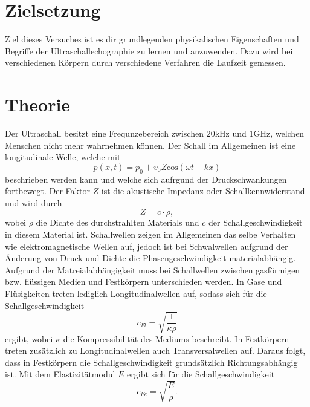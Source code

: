 \section{Zielsetzung}
\label{sec:Zielsetzung}
Ziel dieses Versuches ist es dir grundlegenden physikalischen Eigenschaften und Begriffe der Ultraschallechographie zu lernen und anzuwenden. 
Dazu wird bei verschiedenen Körpern durch verschiedene Verfahren die Laufzeit gemessen.

\section{Theorie}
\label{sec:Theorie}
Der Ultraschall besitzt eine Frequnzebereich zwischen $20 \si{\kilo\Hz}$ und $1 \si{\giga\Hz}$, welchen Menschen nicht mehr wahrnehmen können.
Der Schall im Allgemeinen ist eine longitudinale Welle, welche mit 
\begin{equation*}
    p(x,t) = p_0 + v_0 Z \text{cos}(\omega t - k x)
\end{equation*}
beschrieben werden kann und welche sich aufrgund der Druckschwankungen fortbewegt.
Der Faktor $Z$ ist die akustische Impedanz oder Schallkennwiderstand und wird durch
\begin{equation}
    Z = c \cdot \rho ,
    \label{eqn:Impedanz}
\end{equation}
wobei $\rho$ die Dichte des durchstrahlten Materials und $c$ der Schallgeschwindigkeit in diesem Material ist.
Schallwellen zeigen im Allgemeinen das selbe Verhalten wie elektromagnetische Wellen
auf, jedoch ist bei Schwalwellen aufgrund der Änderung von Druck und Dichte die
Phasengeschwindigkeit materialabhängig.\\
Aufgrund der Matreialabhängigkeit muss bei Schallwellen zwischen gasförmigen bzw. flüssigen Medien und Festkörpern unterschieden werden.
In Gase und Flüsigkeiten treten lediglich Longitudinalwellen auf, sodass sich für die Schallgeschwindigkeit
\begin{equation}
    c_{Fl} = \sqrt{\frac{1}{\kappa \rho}}
    \label{eqn:cFlüssig}
\end{equation}
ergibt, wobei $\kappa$ die Kompressibilität des Mediums beschreibt.
In Festkörpern treten zusätzlich zu Longitudinalwellen auch Transversalwellen auf. Daraus folgt, dass in Festkörpern die Schallgeschwindigkeit 
grundsätzlich Richtungsabhängig ist.
Mit dem Elastizitätmodul $E$ ergibt sich für die Schallgeschwindigkeit
\begin{equation}
    c_{Fe} = \sqrt{\frac{E}{\rho}}.
    \label{eqn:cFest}
\end{equation}
